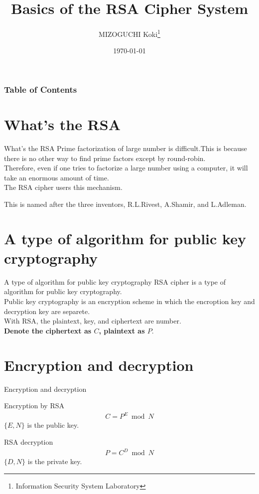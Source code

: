 \documentclass[dvipdfmx]{beamer}
\title[RSA Cipher System]{Basics of the RSA Cipher System}
\author[K.MIZOGUCHI]{MIZOGUCHI Koki\thanks{Information Security System Laboratory}}
\date{\today}
\institute[KUT]{Kochi University of Technology}
\begin{document}
\begin{frame}
\titlepage
\end{frame}

\begin{frame}
\frametitle{Table of Contents}
\tableofcontents
\end{frame}

\section{What's the RSA}
\begin{frame}{What's the RSA}
    Prime factorization of large number is difficult.This is because there is no other way to find prime factors except by round-robin.\\
    Therefore, even if one tries to factorize a large number using a computer, it will take an enormous amount of time.\\
    The RSA cipher users this mechanism.
    \begin{block}{}
        This is named after the three inventors, R.L.Rivest, A.Shamir, and L.Adleman.
    \end{block}
\end{frame}
\section{A type of algorithm for public key cryptography}
\begin{frame}{A type of algorithm for public key cryptography}
    RSA cipher is a type of algorithm for public key cryptography.\\
    Public key cryptography is an encryption scheme in which the encroption key and decryption key are separete.\\
    With RSA, the plaintext, key, and ciphertext are number.\\
    \textbf{Denote the ciphertext as $C$, plaintext as $P$}.
\end{frame}
\section{Encryption and decryption}
\begin{frame}{Encryption and decryption}
    \begin{alertblock}{Encryption by RSA}
        \begin{align}
            C=P^E\bmod N
        \end{align}
        \(\{E,N\}\) is the public key.
    \end{alertblock}
    \begin{alertblock}{RSA decryption}
        \begin{align}
            P=C^D\bmod N
        \end{align}
        \(\{D,N\}\) is the private key.
    \end{alertblock}
\end{frame}
\end{document}
